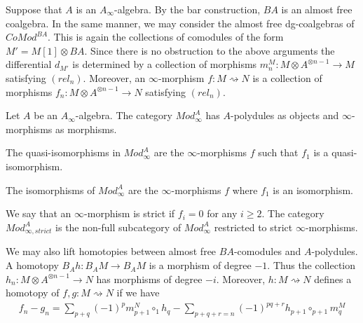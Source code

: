 \documentclass[../thesis.tex]{subfiles}
\begin{document}
            Suppose that $A$ is an $A_\infty$-algebra. By the bar construction, $BA$ is an almost free coalgebra. In the same manner, we may consider the almost free dg-coalgebras of $CoMod^{BA}$. This is again the collections of comodules of the form $M' = M[1] \otimes BA$. Since there is no obstruction to the above arguments the differential $d_{M'}$ is determined by a collection of morphisms $m^M_n : M \otimes A^{\otimes n-1} \rightarrow M$ satisfying $(rel_n)$. Moreover, an $\infty$-morphism $f: M \rightsquigarrow N$ is a collection of morphisms $f_n : M \otimes A^{\otimes n-1} \rightarrow N$ satisfying $(rel_n)$.

            \begin{definition}
                Let $A$ be an $A_\infty$-algebra. The category $Mod_\infty^A$ has $A$-polydules as objects and $\infty$-morphisms as morphisms.

                The quasi-isomorphisms in $Mod_\infty^A$ are the $\infty$-morphisms $f$ such that $f_1$ is a quasi-isomorphism.
            \end{definition}

            \begin{remark}
                The isomorphisms of $Mod_\infty^A$ are the $\infty$-morphisms $f$ where $f_1$ is an isomorphism.
            \end{remark}

            We say that an $\infty$-morphism is strict if $f_i = 0$ for any $i\geq 2$. The category $Mod_{\infty, strict}^A$ is the non-full subcategory of $Mod_\infty^A$ restricted to strict $\infty$-morphisms.

            We may also lift homotopies between almost free $BA$-comodules and $A$-polydules. A homotopy $B_Ah : B_AM \rightarrow B_AM$ is a morphism of degree $-1$. Thus the collection $h_n : M \otimes A^{\otimes n-1} \rightarrow N$ has morphisms of degree $-i$. Moreover, $h : M \rightsquigarrow N$ defines a homotopy of $f, g : M \rightsquigarrow N$ if we have
            \begin{align*}
                f_n - g_n = \sum_{p+q}(-1)^{p}m^N_{p+1}\circ_1 h_q - \sum_{p+q+r = n}(-1)^{pq+r}h_{p+1}\circ_{p+1} m^M_q
            \end{align*}
\end{document}
